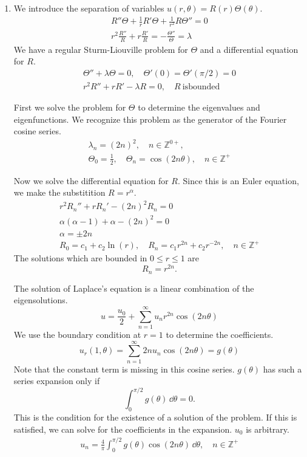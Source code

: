 {\begin{Solution}
\begin{enumerate}
  \item
    We introduce the separation of variables $u(r, \theta) = R(r) \Theta(\theta)$.
    \begin{gather*}
      R'' \Theta + \frac{1}{r} R' \Theta + \frac{1}{r^2} R \Theta'' = 0
      \\
      r^2 \frac{R''}{R} + r \frac{R'}{R} = - \frac{\Theta''}{\Theta} = \lambda
    \end{gather*}
    We have a regular Sturm-Liouville problem for $\Theta$ and a differential 
    equation for $R$.
    \begin{gather}
      \label{eqn T''+lT=0, T'=T'=0}
      \Theta'' + \lambda \Theta = 0, \quad \Theta'(0) = \Theta'(\pi/2) = 0
      \\
      \nonumber
      r^2 R'' + r R' - \lambda R = 0, \quad R\ \mathrm{is bounded}
    \end{gather}

    First we solve the problem for $\Theta$ to determine the eigenvalues and
    eigenfunctions.  We recognize this problem as the generator of 
    the Fourier cosine series.
    \begin{gather*}
      \lambda_n = (2 n)^2, \quad n \in \mathbb{Z}^{0+},
      \\
      \Theta_0 = \frac{1}{2}, \quad \Theta_n = \cos \left( 2 n \theta \right), 
      \quad n \in \mathbb{Z}^+
    \end{gather*}

    Now we solve the differential equation for $R$.  Since this is an Euler
    equation, we make the substitition $R = r^\alpha$.
    \begin{gather*}
      r^2 R_n'' + r R_n' - (2 n)^2 R_n = 0
      \\
      \alpha (\alpha - 1) + \alpha - (2 n)^2 = 0
      \\
      \alpha = \pm 2 n
      \\
      R_0 = c_1 + c_2 \ln(r), \quad R_n = c_1 r^{2 n} + c_2 r^{- 2 n}, \quad n \in \mathbb{Z}^+
    \end{gather*}
    The solutions which are bounded in $0 \leq r \leq 1$ are
    \[
    R_n = r^{2 n}.
    \]

    The solution of Laplace's equation is a linear combination of the 
    eigensolutions.
    \[
    u = \frac{u_0}{2} + \sum_{n = 1}^\infty u_n r^{2 n} \cos \left( 2 n \theta \right)
    \]
    We use the boundary condition at $r = 1$ to determine the coefficients.
    \[
    u_r(1,\theta) = \sum_{n = 1}^\infty 2 n u_n \cos (2 n \theta) = g(\theta)
    \]
    Note that the constant term is missing in this cosine series.
    $g(\theta)$ has such a series expansion only if
    \[
    \int_0^{\pi/2} g(\theta) \,\dd \theta = 0.
    \]
    This is the condition for the existence of a solution of the problem.
    If this is satisfied, we can solve for the coefficients in the expansion.
    $u_0$ is arbitrary.
    \begin{gather*}
      u_n = \frac{4}{\pi} \int_0^{\pi/2} g(\theta) \cos \left( 2 n \theta \right) \,\dd \theta, 
      \quad n \in \mathbb{Z}^+
    \end{gather*}
    

\end{enumerate}
\end{Solution}}
